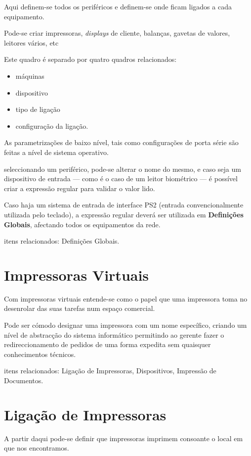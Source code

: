 \documentclass[a4paper,11pt,openany]{memoir}
\begin{document}
Aqui definem-se todos os periféricos e definem-se onde ficam ligados a cada equipamento.

Pode-se criar impressoras, \emph{displays} de cliente, balanças, gavetas de valores, leitores vários, etc

Este quadro é separado por quatro quadros relacionados: 
\begin{itemize}
\item máquinas
\item dispositivo
\item tipo de ligação
\item configuração da ligação.
\end{itemize}

As parametrizações de baixo nível, tais como configurações de porta série são feitas a nível de sistema operativo.

seleccionando um periférico, pode-se alterar o nome do mesmo, e caso seja um dispositivo de entrada --- como é o caso 
de um leitor biométrico --- é possível criar a expressão regular para validar o valor lido.

Caso haja um sistema de entrada de interface PS2 (entrada convencionalmente utilizada pelo teclado), 
a expressão regular deverá ser utilizada em \textbf{Definições Globais}, afectando todos os equipamentos da rede.

itens relacionados: Definições Globais.

\section{Impressoras Virtuais}

Com impressoras virtuais entende-se como o papel que uma impressora toma no desenrolar das suas tarefas num espaço comercial.

Pode ser cómodo designar uma impressora com um nome específico, criando um nível de abstracção do sistema informático
permitindo ao gerente fazer o redireccionamento de pedidos de uma forma expedita sem quaisquer conhecimentos técnicos.

itens relacionados: Ligação de Impressoras, Dispositivos, Impressão de Documentos.

\section{Ligação de Impressoras}

A partir daqui pode-se definir que impressoras imprimem consoante o local em que nos encontramos.
\end{document}
